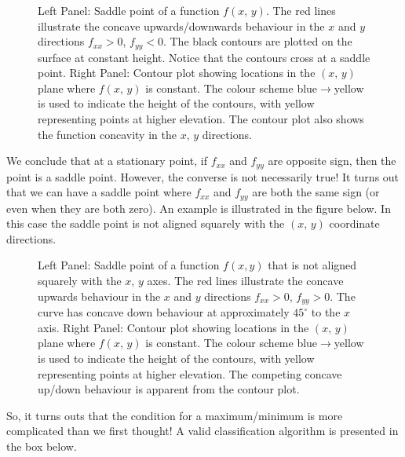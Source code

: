 \documentclass[letterpaper,10pt,english]{jupyterBook}
\begin{document}
\begin{figure}[htbp]
\centering
\capstart

\noindent{}
\caption{Left Panel: Saddle point of a function \(f(x,\,y)\). The red lines illustrate the concave upwards/downwards behaviour in the \(x\) and \(y\) directions
\(f_{xx}>0\), \(f_{yy}<0\). The black contours are plotted on the surface at constant height. Notice that the contours cross at a saddle point.
Right Panel: Contour plot showing locations in the \((x,\,y)\) plane where \(f(x,\,y)\) is constant. The colour scheme blue\(\rightarrow\)yellow
is used to indicate the height of the contours, with yellow representing points at higher elevation. The contour plot also shows the function concavity in the
\(x,\, y\) directions.}\label{\detokenize{VectorCalculus/partialdifferentiation:saddle1}}\end{figure}

\sphinxAtStartPar
We conclude that at a stationary point, if \(f_{xx}\) and \(f_{yy}\) are opposite sign, then the point is a saddle point. However, the converse is not
necessarily true! It turns out that we can have a saddle point where \(f_{xx}\) and \(f_{yy}\) are both the same sign (or even when they are both zero). An example is
illustrated in the figure below. In this case the saddle point is not aligned squarely with the \((x,\,y)\) coordinate directions.

\begin{figure}[htbp]
\centering
\capstart

\noindent{}
\caption{Left Panel: Saddle point of a function \(f(x,y)\) that is not aligned squarely with the \(x,\,y\) axes. The red lines illustrate the concave upwards
behaviour in the \(x\) and \(y\) directions \(f_{xx}>0\), \(f_{yy}>0\). The curve has concave down behaviour at approximately \(45^{\circ}\) to the \(x\)\sphinxhyphen{}axis.
Right Panel: Contour plot showing locations in the \((x,\,y)\) plane where \(f(x,\,y)\) is constant. The colour scheme blue\(\rightarrow\)yellow is used
to indicate the height of the contours, with yellow representing points at higher elevation. The competing concave up/down behaviour is apparent from the contour plot.}\label{\detokenize{VectorCalculus/partialdifferentiation:squish}}\end{figure}

\sphinxAtStartPar
So, it turns outs that the condition for a maximum/minimum is more complicated than we first thought! A valid classification algorithm is presented in the box below.
\end{document}
